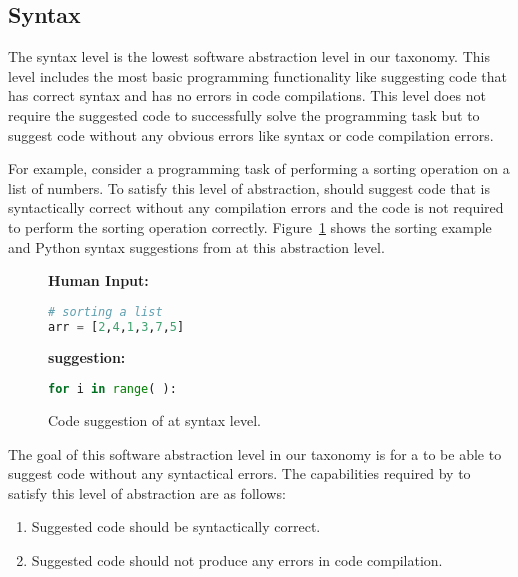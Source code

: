 \subsection{Syntax}
\label{syntax}
The syntax level is the lowest software abstraction level in our taxonomy. 
This level includes the most basic programming functionality like suggesting code that has correct syntax and has no errors in code compilations. 
This level does not require the \cct{} suggested code to successfully solve the programming task but to suggest code without any obvious errors like syntax or code compilation errors.

For example, consider a programming task of performing a sorting operation on a list of numbers. 
To satisfy this level of abstraction, \cct{} should suggest code that is syntactically correct without any compilation errors and the code is not required to perform the sorting operation correctly. 
Figure~\ref{fig:syntax} shows the sorting example and Python syntax suggestions from \cct{} at this abstraction level.

\begin{figure}[hbt!]
    \centering
\begin{tcolorbox}[title=Syntax level suggestion for sort routine,boxsep=.15mm]
\textbf{Human Input:}
\begin{lstlisting}[language={Python}]
# sorting a list
arr = [2,4,1,3,7,5]
\end{lstlisting}
\tcbline
\textbf{\cct{} suggestion:}
\begin{lstlisting}[language={Python}]
for i in range( ):
\end{lstlisting}
\end{tcolorbox}
    \caption{Code suggestion of \cct{} at syntax level.}
    \label{fig:syntax}
\end{figure}

The goal of this software abstraction level in our taxonomy is for a \cct{} to be able to suggest code without any syntactical errors.
The capabilities required by \cct{} to satisfy this level of abstraction are as follows:

\begin{enumerate}
    \item Suggested code should be syntactically correct.
    \item Suggested code should not produce any errors in code compilation.
\end{enumerate}


